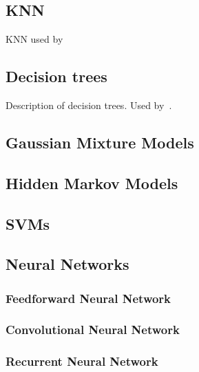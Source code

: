 \subsection{KNN}

KNN used by~\cite{ramashini2019bird}

\subsection{Decision trees}

Description of decision trees. Used by~\cite{acevedo2009automated}.

\subsection{Gaussian Mixture Models}

\subsection{Hidden Markov Models}

\subsection{SVMs}

\subsection{Neural Networks}

\subsubsection{Feedforward Neural Network}

\subsubsection{Convolutional Neural Network}

\subsubsection{Recurrent Neural Network}
